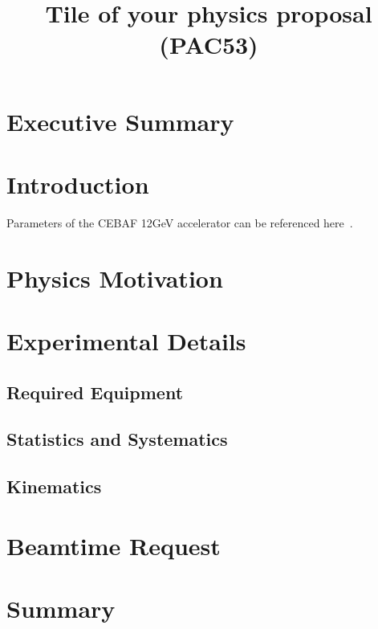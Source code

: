 \documentclass[titlepage,10pt]{article}
\begin{document}
\title{Tile of your physics proposal \\(PAC53)} %


\maketitle

\section*{Executive Summary}

\newpage

\section{Introduction}

Parameters of the CEBAF 12GeV accelerator can be referenced here~\cite{Adderley:2024czm}.

\section{Physics Motivation}

\section{Experimental Details}

\subsection{Required Equipment}
\subsection{Statistics and Systematics}
\subsection{Kinematics}

\section{Beamtime Request}

\section{Summary}



%
%
%


%
%
%
%
\newpage


\end{document}
